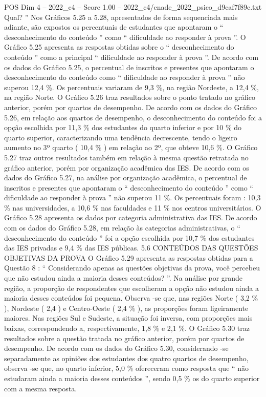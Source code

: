 \begin{textsample}{POS Dim 4 – 2022\_c4 – Score 1.00 – 2022\_c4/enade\_2022\_psico\_d9caf7f89c.txt}
Qual? ” Nos Gráficos 5.25 a 5.28, apresentados de forma sequenciada mais adiante, são expostos os percentuais de estudantes que apontaram o “ desconhecimento do conteúdo ” como “ dificuldade ao responder à prova ”.
O Gráfico 5.25 apresenta as respostas obtidas sobre o “ desconhecimento do conteúdo ” como a principal “ dificuldade ao responder à prova ”.
De acordo com os dados do Gráfico 5.25, o percentual de inscritos e presentes que apontaram o desconhecimento do conteúdo como “ dificuldade ao responder à prova ” não superou 12,4 \%.
Os percentuais variaram de 9,3 \%, na região Nordeste, a 12,4 \%, na região Norte.
O Gráfico 5.26 traz resultados sobre o ponto tratado no gráfico anterior, porém por quartos de desempenho.
De acordo com os dados do Gráfico 5.26, em relação aos quartos de desempenho, o desconhecimento do conteúdo foi a opção escolhida por 11,3 \% dos estudantes do quarto inferior e por 10 \% do quarto superior, caracterizando uma tendência decrescente, tendo o ligeiro aumento no 3º quarto ( 10,4 \% ) em relação ao 2º, que obteve 10,6 \%.
O Gráfico 5.27 traz outros resultados também em relação à mesma questão retratada no gráfico anterior, porém por organização acadêmica das IES.
De acordo com os dados do Gráfico 5.27, na análise por organização acadêmica, o percentual de inscritos e presentes que apontaram o “ desconhecimento do conteúdo ” como “ dificuldade ao responder à prova ” não superou 11 \%.
Os percentuais foram : 10,3 \% nas universidades, a 10,6 \% nas faculdades e 11 \% nos centros universitários.
O Gráfico 5.28 apresenta os dados por categoria administrativa das IES.
De acordo com os dados do Gráfico 5.28, em relação às categorias administrativas, o “ desconhecimento do conteúdo ” foi a opção escolhida por 10,7 \% dos estudantes das IES privadas e 9,4 \% das IES públicas. 5.6 CONTEÚDOS DAS QUESTÕES OBJETIVAS DA PROVA O Gráfico 5.29 apresenta as respostas obtidas para a Questão 8 : “ Considerando apenas as questões objetivas da prova, você percebeu que não estudou ainda a maioria desses conteúdos? ”.
Na análise por grande região, a proporção de respondentes que escolheram a opção não estudou ainda a maioria desses conteúdos foi pequena.
Observa -se que, nas regiões Norte ( 3,2 \% ), Nordeste ( 2,4 ) e Centro-Oeste ( 2,4 \% ), as proporções foram ligeiramente maiores.
Nas regiões Sul e Sudeste, a situação foi inversa, com proporções mais baixas, correspondendo a, respectivamente, 1,8 \% e 2,1 \%.
O Gráfico 5.30 traz resultados sobre a questão tratada no gráfico anterior, porém por quartos de desempenho.
De acordo com os dados do Gráfico 5.30, considerando -se separadamente as opiniões dos estudantes dos quatro quartos de desempenho, observa -se que, no quarto inferior, 5,0 \% ofereceram como resposta que “ não estudaram ainda a maioria desses conteúdos ”, sendo 0,5 \% os do quarto superior com a mesma resposta.

\end{textsample}

